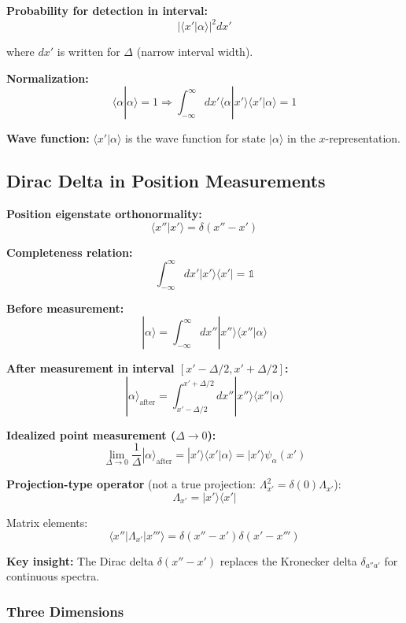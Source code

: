 \documentclass[11pt,a4paper]{article}
\begin{document}
\textbf{Probability for detection in interval:}
\begin{equation}
|\langle x'|\alpha\rangle|^2 dx'
\tag{1.188}
\end{equation}

where $dx'$ is written for $\Delta$ (narrow interval width).

\textbf{Normalization:}
\begin{equation}
\langle\alpha|\alpha\rangle = 1 \Rightarrow \int_{-\infty}^{\infty} dx'\langle\alpha|x'\rangle\langle x'|\alpha\rangle = 1
\tag{1.190}
\end{equation}

\textbf{Wave function:} $\langle x'|\alpha\rangle$ is the wave function for state $|\alpha\rangle$ in the $x$-representation.

\subsection*{Dirac Delta in Position Measurements}

\textbf{Position eigenstate orthonormality:}
$$\boxed{\langle x''|x'\rangle = \delta(x'' - x')}$$

\textbf{Completeness relation:}
$$\boxed{\int_{-\infty}^{\infty} dx' |x'\rangle\langle x'| = \mathbb{1}}$$

\textbf{Before measurement:}
$$|\alpha\rangle = \int_{-\infty}^{\infty} dx'' |x''\rangle\langle x''|\alpha\rangle$$

\textbf{After measurement in interval $[x' - \Delta/2, x' + \Delta/2]$:}
$$|\alpha\rangle_{\text{after}} = \int_{x'-\Delta/2}^{x'+\Delta/2} dx'' |x''\rangle\langle x''|\alpha\rangle$$

\textbf{Idealized point measurement ($\Delta \to 0$):}
$$\lim_{\Delta \to 0} \frac{1}{\Delta}|\alpha\rangle_{\text{after}} = |x'\rangle\langle x'|\alpha\rangle = |x'\rangle\psi_\alpha(x')$$

\textbf{Projection-type operator} (not a true projection: $\Lambda_{x'}^2 = \delta(0)\Lambda_{x'}$):
$$\Lambda_{x'} = |x'\rangle\langle x'|$$

Matrix elements:
$$\langle x''|\Lambda_{x'}|x'''\rangle = \delta(x'' - x')\delta(x' - x''')$$

\textbf{Key insight:} The Dirac delta $\delta(x'' - x')$ replaces the Kronecker delta $\delta_{a''a'}$ for continuous spectra.

\subsubsection{Three Dimensions}
\end{document}
